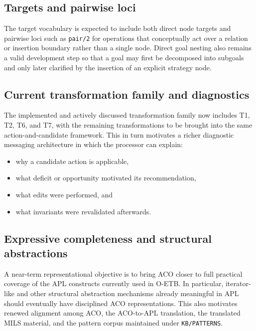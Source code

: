 \documentclass[11pt,twoside,a4paper]{article}
\begin{document}
\subsection{Targets and pairwise loci}

The target vocabulary is expected to include both direct node targets and pairwise loci such as \texttt{pair/2} for operations that conceptually act over a relation or insertion boundary rather than a single node.
Direct goal nesting also remains a valid development step so that a goal may first be decomposed into subgoals and only later clarified by the insertion of an explicit strategy node.

\subsection{Current transformation family and diagnostics}

The implemented and actively discussed transformation family now includes T1, T2, T6, and T7, with the remaining transformations to be brought into the same action-and-candidate framework.
This in turn motivates a richer diagnostic messaging architecture in which the processor can explain:
\begin{itemize}[leftmargin=2em]
  \item why a candidate action is applicable,
  \item what deficit or opportunity motivated its recommendation,
  \item what edits were performed, and
  \item what invariants were revalidated afterwards.
\end{itemize}

\subsection{Expressive completeness and structural abstractions}

A near-term representational objective is to bring ACO closer to full practical coverage of the APL constructs currently used in O-ETB.
In particular, iterator-like and other structural abstraction mechanisms already meaningful in APL should eventually have disciplined ACO representations.
This also motivates renewed alignment among ACO, the ACO-to-APL translation, the translated MILS material, and the pattern corpus maintained under \texttt{KB/PATTERNS}.
\end{document}
